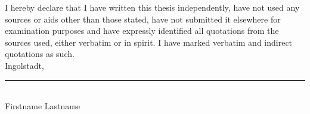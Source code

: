 
I hereby declare that I have written this thesis independently, have not used any sources or aids other than those stated, have not submitted it elsewhere for examination purposes and have expressly identified all quotations from the sources used, either verbatim or in spirit. I have marked verbatim and indirect quotations as such.	\\[2em]
	
Ingolstadt, \rule{0.3\textwidth}{0.4pt}	\\ [1.5cm]
	
Firstname Lastname

